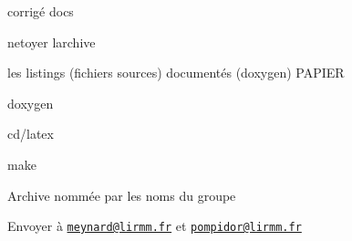 
\begin{DoxyItemize}
\item corrigé docs
\item netoyer l\textquotesingle{}archive
\item les listings (fichiers sources) documentés (doxygen) P\+A\+P\+I\+ER
\begin{DoxyItemize}
\item doxygen
\item cd/latex
\item make
\end{DoxyItemize}
\item Archive nommée par les noms du groupe
\item Envoyer à \href{mailto:meynard@lirmm.fr}{\tt meynard@lirmm.\+fr} et \href{mailto:pompidor@lirmm.fr}{\tt pompidor@lirmm.\+fr}
\end{DoxyItemize}






